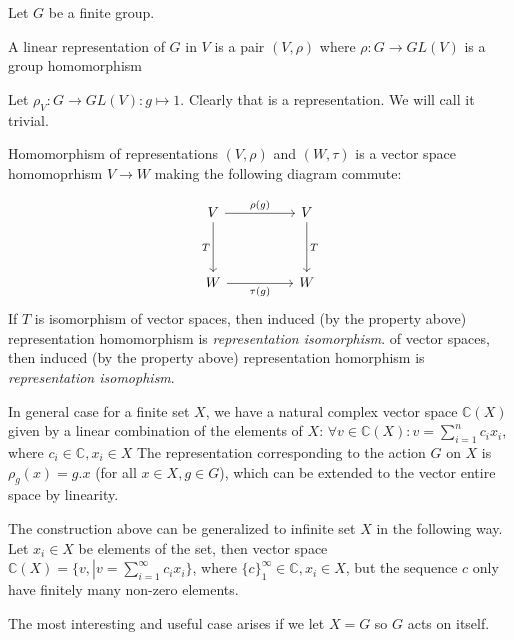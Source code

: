 \documentclass{amsart}
\begin{document}
    Let $G$ be a finite group.
    \begin{definition}
        A linear representation of $G$ in $V$ is a pair $(V, \rho)$ where $\rho: G \to GL(V)$ is a group homomorphism
    \end{definition}

    \begin{example}
        Let $\rho_V : G \to GL(V): g \mapsto 1$.
        Clearly that is a representation. We will call it trivial.
    \end{example}

    \begin{definition}
        Homomorphism of representations $(V, \rho)$ and $(W, \tau)$ is a vector space homomoprhism $V \to W$ making the following diagram commute:
    \end{definition}
    \[\begin{tikzcd}
        V && V \\
        \\
        W && W
        \arrow["{\rho(g)}", from=1-1, to=1-3]
        \arrow["T", from=1-3, to=3-3]
        \arrow["T"', from=1-1, to=3-1]
        \arrow["{\tau(g)}"', from=3-1, to=3-3]
    \end{tikzcd}\]
    If $T$ is isomorphism of vector spaces, then induced (by the property above) representation homomorphism is \textit{representation isomorphism}. of vector spaces, then induced (by the property above) representation homorphism is \textit{representation isomophism}.

    In general case for a finite set $X$, we have a natural complex vector space $\mathbb{C}(X)$ given by a linear combination of the elements of $X$:
$\forall v \in \mathbb{C}(X): v = \sum_{i=1}^n c_i x_i$, where $c_i \in \mathbb{C}, x_i \in X$
The representation corresponding to the action $G$ on $X$ is $\rho_g (x) = g . x$ (for all $x\in X, g \in G$), which can be extended to the vector entire space by linearity.

\begin{note}
    The construction above can be generalized to infinite set $X$ in the following way.
    Let $x_i \in X$ be elements of the set, 
    then vector space $\mathbb{C}(X)=\{ v, \left. \right| v = \sum_{i=1}^\infty c_i x_i\}$, where $ \{c\}_1^\infty \in \mathbb{C}, x_i \in X$, 
    but the sequence $c$ only have finitely many non-zero elements.
\end{note}

The most interesting and useful case arises if we let $X = G$ so $G$ acts on itself.
\end{document}
